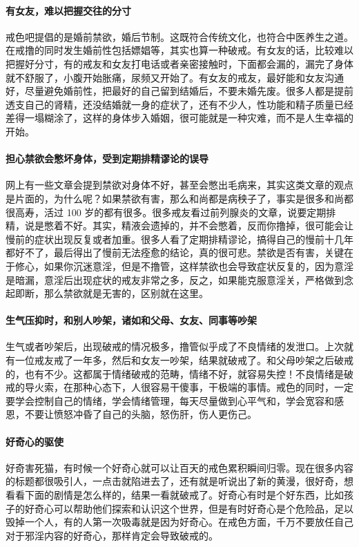 \paragraph{有女友，难以把握交往的分寸} 戒色吧提倡的是婚前禁欲，婚后节制。这既符合传统文化，也符合中医养生之道。在戒撸的同时发生婚前性包括嫖娼等，其实也算一种破戒。有女友的话，比较难以把握好分寸，有的戒友和女友打电话或者亲密接触时，下面都会漏的，漏完了身体就不舒服了，小腹开始胀痛，尿频又开始了。有女友的戒友，最好能和女友沟通好，尽量避免婚前性，把最好的自己留到结婚后，不要未婚先废。很多人都是提前透支自己的肾精，还没结婚就一身的症状了，还有不少人，性功能和精子质量已经差得一塌糊涂了，这样的身体步入婚姻，很可能就是一种灾难，而不是人生幸福的开始。

\paragraph{担心禁欲会憋坏身体，受到定期排精谬论的误导} 网上有一些文章会提到禁欲对身体不好，甚至会憋出毛病来，其实这类文章的观点是片面的，为什么呢？如果禁欲有害，那么和尚都是病秧子了，事实是很多和尚都很高寿，活过 100 岁的都有很多。很多戒友看过前列腺炎的文章，说要定期排精，说是憋着不好。其实，精液会遗掉的，并不会憋着，反而你撸掉，很可能会让慢前的症状出现反复或者加重。很多人看了定期排精谬论，搞得自己的慢前十几年都好不了，最后得出了慢前无法痊愈的结论，真的很可悲。禁欲是否有害，关键在于修心，如果你沉迷意淫，但是不撸管，这样禁欲也会导致症状反复的，因为意淫是暗漏，意淫后出现症状的戒友非常之多，反之，如果能克服意淫关，严格做到念起即断，那么禁欲就是无害的，区别就在这里。

\paragraph{生气压抑时，和别人吵架，诸如和父母、女友、同事等吵架} 生气或者吵架后，出现破戒的情况极多，撸管似乎成了不良情绪的发泄口。上次就有一位戒友戒了一年多，然后和女友一吵架，结果就破戒了。和父母吵架之后破戒的，也有不少。这都属于情绪破戒的范畴，情绪不好，就容易失控！不良情绪是破戒的导火索，在那种心态下，人很容易干傻事，干极端的事情。戒色的同时，一定要学会控制自己的情绪，学会情绪管理，每天尽量做到心平气和，学会宽容和感恩，不要让愤怒冲昏了自己的头脑，怒伤肝，伤人更伤己。

\paragraph{好奇心的驱使} 好奇害死猫，有时候一个好奇心就可以让百天的戒色累积瞬间归零。现在很多内容的标题都很吸引人，一点击就陷进去了，还有就是听说出了新的黄漫，很好奇，想看看下面的剧情是怎么样的，结果一看就破戒了。好奇心有时是个好东西，比如孩子的好奇心可以帮助他们探索和认识这个世界，但是有时好奇心是个危险品，足以毁掉一个人，有的人第一次吸毒就是因为好奇心。在戒色方面，千万不要放任自己对于邪淫内容的好奇心，那样肯定会导致破戒的。

